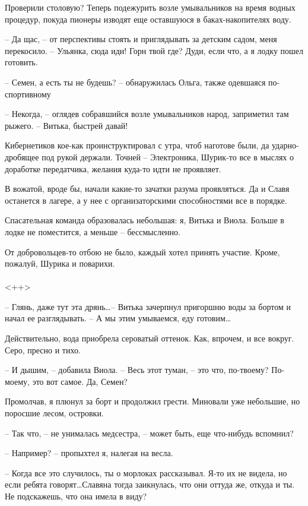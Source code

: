 \documentclass[a4paper]{book}
\begin{document}
Проверили столовую? Теперь подежурить возле умывальников на время водных процедур, покуда пионеры изводят еще оставшуюся в баках-накопителях воду.

-- Да щас, -- от перспективы стоять и приглядывать за детским садом, меня перекосило. -- Ульянка, сюда иди! Горн твой где? Дуди, если что, а я лодку пошел готовить.

-- Семен, а есть ты не будешь? -- обнаружилась  Ольга, также одевшаяся по-спортивному

-- Некогда, -- оглядев собравшийся возле умывальников народ, заприметил там рыжего. -- Витька, быстрей давай!

Кибернетиков кое-как проинструктировал с утра, чтоб наготове были, да ударно-дробящее под рукой держали. Точней -- Электроника, Шурик-то все в мыслях о доработке передатчика, желания куда-то идти не проявляет. 

В вожатой, вроде бы, начали какие-то зачатки разума проявляться. Да и Славя останется в лагере, а у нее с организаторскими способностями все в порядке.

Спасательная команда образовалась небольшая: я, Витька и Виола. Больше в лодке не поместится, а меньше -- бессмысленно. 

От добровольцев-то отбою не было, каждый хотел принять участие. Кроме, пожалуй, Шурика и поварихи.

\paragraph{}<++>

-- Глянь, даже тут эта дрянь\ldots -- Витька зачерпнул пригоршню воды за бортом и начал ее разглядывать. -- А мы этим умываемся, еду готовим\ldots 

Действительно, вода приобрела сероватый оттенок. Как, впрочем, и все вокруг. Серо, пресно и тихо.

-- И дышим, -- добавила Виола. -- Весь этот туман, -- это что, по-твоему? По-моему, это вот самое. Да, Семен?

Промолчав, я плюнул за борт и продолжил грести. Миновали уже небольшие, но поросшие лесом, островки. 

-- Так что, -- не унималась медсестра, -- может быть, еще что-нибудь вспомнил? 

-- Например? -- пропыхтел я, налегая на весла.

-- Когда все это случилось, ты о морлоках рассказывал. Я-то их не видела, но если ребята говорят\ldots Славяна тогда заикнулась, что они оттуда же, откуда и ты. Не подскажешь, что она имела в виду?
\end{document}
